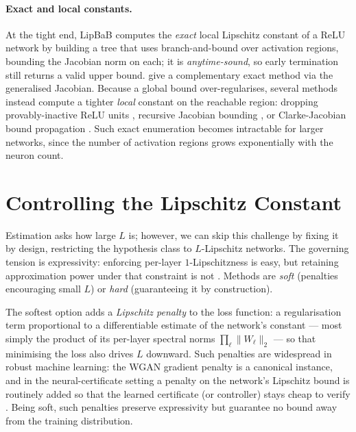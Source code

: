 \paragraph{Exact and local constants.} At the tight end, LipBaB \cite{bhowmick2021lipbab} computes the \emph{exact} local Lipschitz constant of a ReLU network by building a tree that uses branch-and-bound over activation regions, bounding the Jacobian norm on each; it is \emph{anytime-sound}, so early termination still returns a valid upper bound. \cite{jordan2020exactly} give a complementary exact method via the generalised Jacobian. Because a global bound over-regularises, several methods instead compute a tighter \emph{local} constant on the reachable region: dropping provably-inactive ReLU units \cite{huang2021training}, recursive Jacobian bounding \cite{zhang2019recurjac}, or Clarke-Jacobian bound propagation \cite{shi2022efficiently}. Such exact enumeration becomes intractable for larger networks, since the number of activation regions grows exponentially with the neuron count.


\section{Controlling the Lipschitz Constant}
\label{sec:control}

Estimation asks how large $L$ is; however, we can skip this challenge by fixing it by design, restricting the hypothesis class to $L$-Lipschitz networks. The governing tension is expressivity: enforcing per-layer $1$-Lipschitzness is easy, but retaining approximation power under that constraint is not \cite{anil2019sorting}. Methods are \emph{soft} (penalties encouraging small $L$) or \emph{hard} (guaranteeing it by construction).

The softest option adds a \emph{Lipschitz penalty} to the loss function: a regularisation term proportional to a differentiable estimate of the network's constant --- most simply the product of its per-layer spectral norms $\prod_{\ell}\|W_\ell\|_2$ --- so that minimising the loss also drives $L$ downward. Such penalties are widespread in robust machine learning: the WGAN gradient penalty \cite{gulrajani2017improved} is a canonical instance, and in the neural-certificate setting a penalty on the network's Lipschitz bound is routinely added so that the learned certificate (or controller) stays cheap to verify \cite{ansaripour2023learning}. Being soft, such penalties preserve expressivity but guarantee no bound away from the training distribution.

